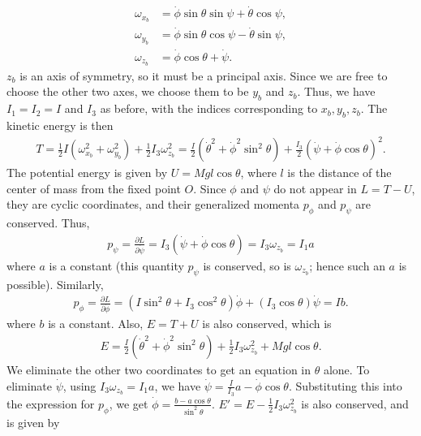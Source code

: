 \begin{align}
    \omega_{x_{b}} &= \dot{\phi} \sin \theta \sin \psi + \dot{\theta} \cos \psi,\\
    \omega_{y_{b}} &= \dot{\phi} \sin \theta \cos \psi - \dot{\theta} \sin \psi,\\
    \omega_{z_{b}} &= \dot{\phi} \cos \theta + \dot{\psi}.
\end{align}
$z_{b}$ is an axis of symmetry, so it must be a principal axis. Since we are free to choose the other two axes, we choose them to be $y_{b}$ and $z_{b}$. Thus, we have $I_{1} = I_{2} = I$ and $I_{3}$ as before, with the indices corresponding to $x_{b},y_{b},z_{b}$. The kinetic energy is then
\begin{align}
    T = \frac{1}{2}I(\omega_{x_{b}}^{2} + \omega_{y_{b}}^{2}) + \frac{1}{2} I_{3} \omega_{z_{b}}^{2} = \frac{I}{2}(\dot{\theta}^{2} + \dot{\phi}^{2} \sin^{2} \theta) + \frac{I_{3}}{2} (\dot{\psi} + \dot{\phi} \cos \theta)^{2}.
\end{align}
The potential energy is given by $U = Mgl \cos \theta$, where $l$ is the distance of the center of mass from the fixed point $O$. Since $\phi$ and $\psi$ do not appear in $L = T-U$, they are cyclic coordinates, and their generalized momenta $p_{\phi}$ and $p_{\psi}$ are conserved. Thus,
\begin{align}
    p_{\psi} = \frac{\partial L}{\partial \dot{\psi}} = I_{3}(\dot{\psi} + \dot{\phi} \cos \theta) = I_{3} \omega_{z_{b}} = I_{1}a
\end{align}
where $a$ is a constant (this quantity $p_{\psi}$ is conserved, so is $\omega_{z_{b}}$; hence such an $a$ is possible). Similarly,
\begin{align}
    p_{\phi} = \frac{\partial L}{\partial \dot{\phi}} = (I \sin^{2}\theta + I_{3} \cos^{2} \theta) \dot{\phi} + (I_{3} \cos \theta) \dot{\psi} = I b.
\end{align}
where $b$ is a constant. Also, $E = T+U$ is also conserved, which is
\begin{align}
    E = \frac{I}{2}(\dot{\theta}^{2} + \dot{\phi}^{2} \sin^{2} \theta) + \frac{1}{2} I_{3} \omega_{z_{b}}^{2} + Mgl \cos \theta.
\end{align}
We eliminate the other two coordinates to get an equation in $\theta$ alone. To eliminate $\dot{\psi}$, using $I_{3}\omega_{z_{b}} = I_{1} a$, we have $\dot{\psi} = \frac{I}{I_{3}} a - \dot{\phi} \cos \theta$. Substituting this into the expression for $p_{\phi}$, we get $\dot{\phi} = \frac{b-a \cos \theta}{\sin^{2} \theta}$. $E' = E - \frac{1}{2} I_{3} \omega_{z_{b}}^{2}$ is also conserved, and is given by
